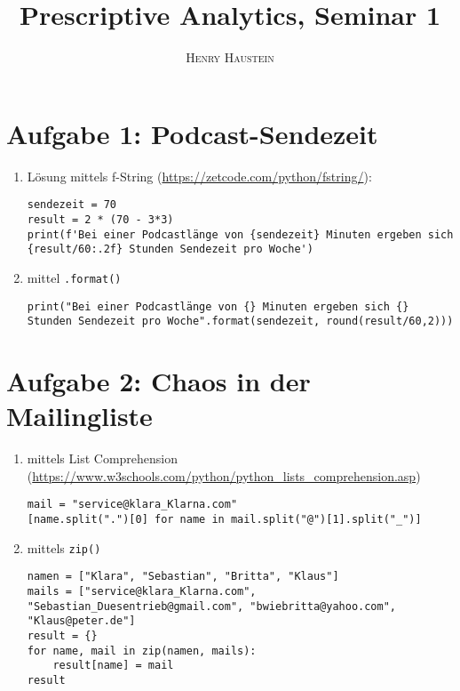 \documentclass{article}
\title{\textbf{Prescriptive Analytics, Seminar 1}}
\author{\textsc{Henry Haustein}}
\date{}
\begin{document}
	\maketitle
	
	\section*{Aufgabe 1: Podcast-Sendezeit}
	\begin{enumerate}[label=(\alph*)]
		\item Lösung mittels f-String (\url{https://zetcode.com/python/fstring/}):
		\begin{lstlisting}
sendezeit = 70
result = 2 * (70 - 3*3)
print(f'Bei einer Podcastlänge von {sendezeit} Minuten ergeben sich {result/60:.2f} Stunden Sendezeit pro Woche')
		\end{lstlisting}
		\item mittel \texttt{.format()}
		\begin{lstlisting}
print("Bei einer Podcastlänge von {} Minuten ergeben sich {} Stunden Sendezeit pro Woche".format(sendezeit, round(result/60,2)))
		\end{lstlisting}
		
	\end{enumerate}

	\section*{Aufgabe 2: Chaos in der Mailingliste}
	\begin{enumerate}[label=(\alph*)]
		\item mittels List Comprehension (\url{https://www.w3schools.com/python/python_lists_comprehension.asp})
		\begin{lstlisting}
mail = "service@klara_Klarna.com"
[name.split(".")[0] for name in mail.split("@")[1].split("_")]
		\end{lstlisting}
		\item mittels \texttt{zip()}
		\begin{lstlisting}
namen = ["Klara", "Sebastian", "Britta", "Klaus"]
mails = ["service@klara_Klarna.com", "Sebastian_Duesentrieb@gmail.com", "bwiebritta@yahoo.com", "Klaus@peter.de"]
result = {}
for name, mail in zip(namen, mails):
	result[name] = mail
result
		\end{lstlisting}
	\end{enumerate}
	
\end{document}
